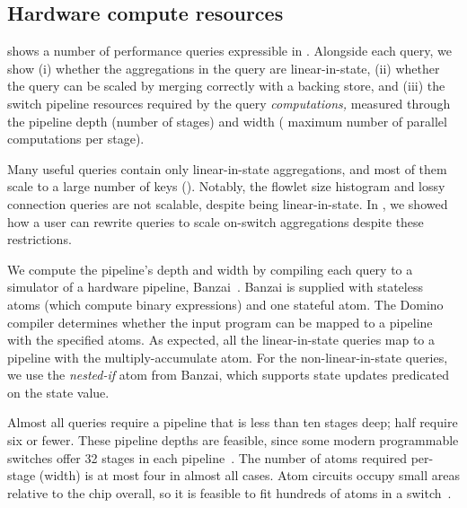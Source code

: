 \subsection{Hardware compute resources}
\label{s:eval:hardware}
\label{sec:eval:hardware}

 shows a number of performance queries
expressible in \TheSystem. Alongside each query, we show (i) whether the
aggregations in the query are linear-in-state, (ii) whether the query can be
scaled by merging correctly with a backing store, and
(iii) the switch pipeline resources required by the query {\em computations,}
measured through the pipeline depth (\ie number of stages) and width (\ie
maximum number of parallel computations per stage).

Many useful queries contain only linear-in-state aggregations, and most of them
scale to a large number of keys (). Notably,
the flowlet size histogram and lossy connection queries are not scalable,
despite being linear-in-state. In , we showed how a
user can rewrite queries to scale on-switch aggregations despite these
restrictions.

We compute the pipeline's depth and width by compiling each query to a simulator
of a hardware pipeline, Banzai~\cite{domino_sigcomm}. Banzai is supplied with
stateless atoms (which compute binary expressions) and one stateful atom. The
Domino compiler determines whether the input program can be mapped to a pipeline
with the specified atoms. As expected, all the linear-in-state queries map to a
pipeline with the multiply-accumulate atom. For the non-linear-in-state queries,
we use the {\em nested-if} atom from Banzai, which supports state updates
predicated on the state value.

Almost all queries require a pipeline that is less than ten stages deep; half
require six or fewer. These pipeline depths are feasible, since some modern
programmable switches offer 32 stages in each pipeline~\cite{rmt}. The number of
atoms required per-stage (width) is at most four in almost all cases.  Atom
circuits occupy small areas relative to the chip overall, so it is feasible to
fit hundreds of atoms in a switch~\cite{domino_sigcomm}.
